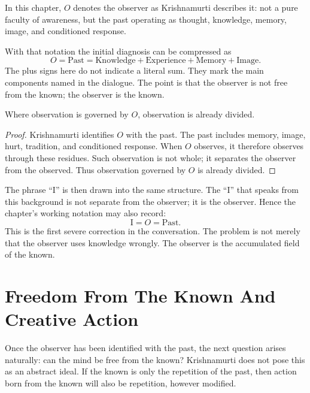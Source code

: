 \begin{definition}
In this chapter, \(O\) denotes the observer as Krishnamurti describes it: not a pure faculty of awareness, but the past operating as thought, knowledge, memory, image, and conditioned response.
\end{definition}

With that notation the initial diagnosis can be compressed as
\begin{equation}
O=\mathrm{Past}=\mathrm{Knowledge}+\mathrm{Experience}+\mathrm{Memory}+\mathrm{Image}.
\end{equation}
The plus signs here do not indicate a literal sum. They mark the main components named in the dialogue. The point is that the observer is not free from the known; the observer is the known.

\begin{proposition}
Where observation is governed by \(O\), observation is already divided.
\end{proposition}

\begin{proof}
Krishnamurti identifies \(O\) with the past. The past includes memory, image, hurt, tradition, and conditioned response. When \(O\) observes, it therefore observes through these residues. Such observation is not whole; it separates the observer from the observed. Thus observation governed by \(O\) is already divided.
\end{proof}

The phrase ``I'' is then drawn into the same structure. The ``I'' that speaks from this background is not separate from the observer; it is the observer. Hence the chapter's working notation may also record:
\begin{equation}
\mathrm{I}=O=\mathrm{Past}.
\end{equation}
This is the first severe correction in the conversation. The problem is not merely that the observer uses knowledge wrongly. The observer is the accumulated field of the known.

\section{Freedom From The Known And Creative Action}

Once the observer has been identified with the past, the next question arises naturally: can the mind be free from the known? Krishnamurti does not pose this as an abstract ideal. If the known is only the repetition of the past, then action born from the known will also be repetition, however modified.

